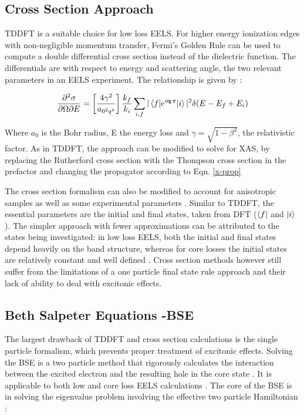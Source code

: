 \subsection{Cross Section Approach}
TDDFT is a suitable choice for low loss EELS.  For higher energy ionization edges with non-negligible momentum transfer, Fermi's Golden Rule can be used to compute a double differential cross section instead of the dielectric function.  The differentials are with respect to energy and scattering angle, the two relevant parameters in an EELS experiment.  The relationship is given by \cite{hebert_practical_2007}:

\begin{equation}
		\frac{\partial^2 \sigma}{\partial \Omega \partial E} = \left[\frac{4\gamma^2}{a_{\mathrm{0}^2q^4}}\right] \frac{k_f}{k_i} \sum_{i,f}|\mel{f}{e^{i\textbf{q}\cdot\textbf{r}}}{i}|^2\delta(E-E_f+E_i)
		\label{telnes_eq}
\end{equation}

Where $a_0$ is the Bohr radius, E the energy loss and $\gamma = \sqrt{1- \beta^2}$, the relativistic factor.  As in TDDFT, the approach can be modified to solve for XAS, by replacing the Rutherford cross section with the Thompson cross section in the prefactor and changing the propagator according to Eqn. \ref{x-prop}



The cross section formalism can also be modified to account for anisotropic samples as well as some experimental parameters \cite{hebert_practical_2007}. Similar to TDDFT, the essential parameters are the initial and final states, taken from DFT ($\bra{f}$ and $\ket{i}$).  The simpler approach with fewer approximations can be attributed to the states being investigated: in low loss EELS, both the initial and final states depend heavily on the band structure, whereas for core losses the initial states are relatively constant and well defined \cite{hebert_practical_2007}.  Cross section methods however still suffer from the limitations of a one particle final state rule approach and their lack of ability to deal with excitonic effects.  

\subsection{Beth Salpeter Equations -BSE}

The largest drawback of TDDFT and cross section calculations is the single particle formalism, which prevents proper treatment of excitonic effects. Solving the BSE is a two particle method that rigorously calculates the  interaction between the excited electron and the resulting hole in the core state \cite{salpeter_relativistic_1951}.  It is applicable to both low and core loss EELS calculations \cite{exciting}.  The core of the BSE is in solving the eigenvalue problem involving the effective two particle Hamiltonian \cite{draxl_bse_2009}: 


